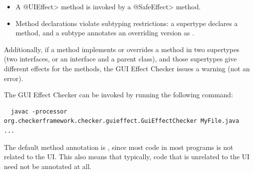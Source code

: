 \begin{itemize}
\item
  A \<@UIEffect> method is invoked by a \<@SafeEffect> method.

\item
  Method declarations violate subtyping restrictions:  a supertype declares
  a  method, and a subtype annotates an overriding
  version as .

\end{itemize}

Additionally, if a method implements or overrides a method in two
supertypes (two interfaces, or an interface and a parent class), and those
supertypes give different effects for the methods, the GUI Effect Checker
issues a warning (not an error).



%



The GUI Effect Checker can be invoked by running the following command:
\begin{Verbatim}
  javac -processor org.checkerframework.checker.guieffect.GuiEffectChecker MyFile.java ...
\end{Verbatim}



The default method annotation is , since most code in most programs is not related
to the UI\@.  This also means that typically, code that is unrelated to the UI need not be annotated
at all.

